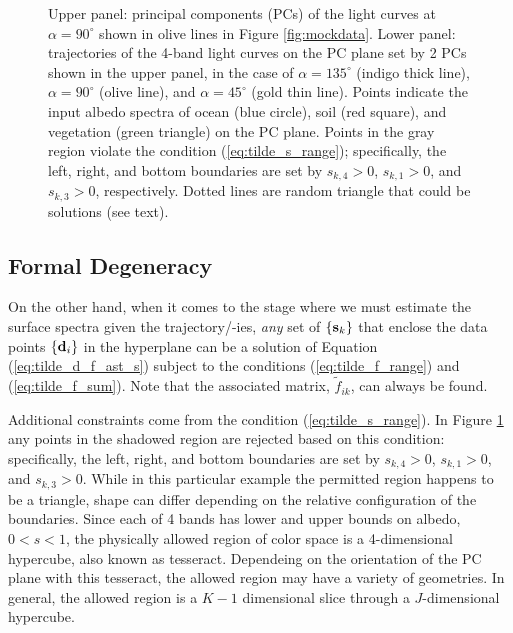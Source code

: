 \documentclass[iop,numberedappendix,apj,]{emulateapj}
\def\fast{\tilde f}
\begin{document}
\begin{figure}[t]
\begin{center}
    \end{center}
    \caption{Upper panel: principal components (PCs) of the light curves at $\alpha = 90^{\circ }$ shown in olive lines in Figure \ref{fig:mockdata}. Lower panel: trajectories of the 4-band light curves on the PC plane set by 2 PCs shown in the upper panel, in the case of $\alpha = 135^{\circ }$ (indigo thick line), $\alpha = 90^{\circ }$ (olive line), and $\alpha = 45^{\circ }$ (gold thin line). Points indicate the input albedo spectra of ocean (blue circle), soil (red square), and vegetation (green triangle) on the PC plane. Points in the gray region violate the condition (\ref{eq:tilde_s_range}); specifically, the left, right, and bottom boundaries are set by $s_{k,4} > 0$, $s_{k,1} > 0$, and $s_{k,3}> 0$, respectively. 
Dotted lines are random triangle that could be solutions (see text). }
    \label{fig:trajectory}
\end{figure}

\subsection{Formal Degeneracy}
\label{ss:degeneracy}

On the other hand, when it comes to the stage where we must estimate the surface spectra given the trajectory/-ies, {\it any} set of $\{ {\bf s}_k \}$ that enclose the data points $\{{\bf d}_i\}$ in the hyperplane can be a solution of Equation (\ref{eq:tilde_d_f_ast_s}) subject to the conditions (\ref{eq:tilde_f_range}) and (\ref{eq:tilde_f_sum}). 
Note that the associated matrix, $\fast _{ik}$, can always be found. 

Additional constraints come from the condition (\ref{eq:tilde_s_range}). 
In Figure \ref{fig:trajectory} any points in the shadowed region are rejected based on this condition: specifically, the left, right, and bottom boundaries are set by $s_{k,4}> 0$, $s_{k,1}> 0$, and $s_{k,3}> 0$. 
While in this particular example the permitted region happens to be a triangle, shape can differ depending on the relative configuration of the boundaries. 
Since each of 4 bands has lower and upper bounds on albedo, $0<s<1$, the physically allowed region of color space is a 4-dimensional hypercube, also known as tesseract. Dependeing on the orientation of the PC plane with this tesseract, the allowed region may have a variety of geometries. 
In general, the allowed region is a $K-1$ dimensional slice through a $J$-dimensional hypercube. 
\end{document}
